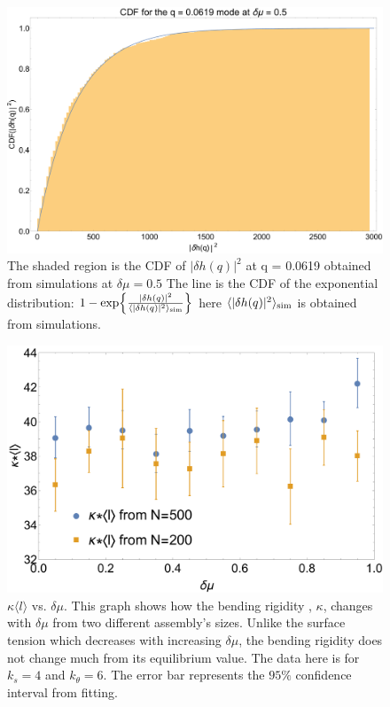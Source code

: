 \documentclass[amsmath,preprintnumbers,10pt,nofootinbib,prl,twocolumn]{revtex4-1}
\begin{document}
\begin{figure}
\centering
\includegraphics[scale=0.2]{Fig6.pdf}
\caption{The shaded region is the CDF of $|\delta h(q)|^2$ at q = 0.0619 obtained from simulations at $\delta\mu=0.5$ The line is the CDF of the exponential distribution: $1-\exp{\frac{|\delta h(q)|^2}{\langle |\delta h(q)|^2\rangle_{\rm{sim}}}}$ here $\langle |\delta h(q)|^2\rangle_{\rm{sim}}$ is obtained from simulations. }  \label{fig:expdistributionaoutofeq}
\end{figure}

\begin{figure}[tbb]
\centering
\includegraphics[scale=0.27]{Fig7.pdf}
\caption{$\kappa\langle l \rangle$ vs. $\delta\mu$. This graph shows how the bending rigidity , $\kappa$, changes with $\delta\mu$ from two different assembly's sizes. Unlike the surface tension which decreases with increasing $\delta\mu$, the bending rigidity does not change much from its equilibrium value. The data here is for $k_s=4$ and $k_\theta = 6$. The error bar represents the $95\%$ confidence interval from fitting.} \label{fig:bendingrigiditynormalization}
\end{figure}
\end{document}
